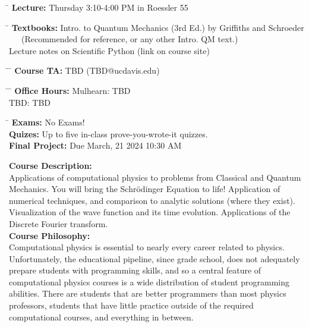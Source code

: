\documentclass[12pt]{article}
\begin{document}
\noindent
\begin{tabbing}
\hspace*{8em} \= \kill 
\textbf {Lecture:} \> Thursday 3:10-4:00 PM in Roessler 55 
\end{tabbing}
\noindent
\begin{tabbing}
\hspace*{8em} \= \kill 
\textbf{Textbooks:} \> Intro. to Quantum Mechanics (3rd Ed.) by Griffiths and Schroeder\\
\> ~~~(Recommended for reference, or any other Intro. QM text.)\\
\> Lecture notes on Scientific Python (link on course site)\\
\end{tabbing}
\noindent
\begin{tabbing}
\hspace*{8em}\= \hspace*{10em} \= \kill 
\textbf{Course TA:} \> TBD \> (TBD@ucdavis.edu)
\end{tabbing}
\noindent
\begin{tabbing}
\hspace*{8em}\= \hspace*{10em} \= \kill 
\textbf{Office Hours:}
    \> Mulhearn: \> TBD \\
    \> TBD: \> TBD
\end{tabbing}
\noindent
\begin{tabbing}
\hspace*{12em}\= \kill 
\textbf{Exams:} \> No Exams!\\
\textbf{Quizes:} \> Up to five in-class prove-you-wrote-it quizzes.\\
\textbf{Final Project:} \> Due March, 21 2024 10:30 AM \\
\end{tabbing}
\noindent
\textbf {Course Description:}\\
Applications of computational physics to problems from Classical and Quantum Mechanics.
You will bring the Schr\"odinger Equation to life!  Application of numerical techniques, and comparison to analytic solutions (where they exist).  Visualization of the wave function and its time evolution.  Applications of the Discrete Fourier transform.\\[8pt]
\noindent
\textbf {Course Philosophy:}\\
Computational physics is essential to nearly every career related to physics.  Unfortunately, the educational pipeline, since grade school, does not adequately prepare students with programming skills, and so a central feature of computational physics courses is a wide distribution of student programming abilities.  There are students that are better programmers than most physics professors, students that have little practice outside of the required computational courses, and everything in between.
\end{document}
